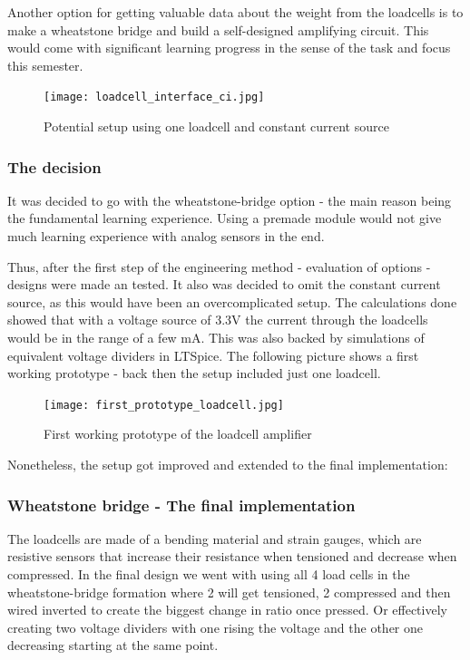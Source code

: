 \documentclass[../report.tex]{subfiles}
\begin{document}
Another option for getting valuable data about the weight from the loadcells
is to make a wheatstone bridge and build a self-designed amplifying circuit.
This would come with significant learning progress in the sense of the task and 
focus this semester.

\begin{figure}[H]
  \centering
  \texttt{[image: loadcell\_interface\_ci.jpg]}
  \caption{Potential setup using one loadcell and constant current source}
\end{figure} 

\subsubsection{The decision}
It was decided to go with the wheatstone-bridge option - the main reason being
the fundamental learning experience. Using a premade module would not give much 
learning experience with analog sensors in the end. 

\quad
Thus, after the first step of the engineering method - evaluation of options -
designs were made an tested.
It also was decided to omit the constant current source, as this would have been an 
overcomplicated setup. The calculations done showed that with a voltage source of 3.3V
the current through the loadcells would be in the range of a few mA. This was also backed
by simulations of equivalent voltage dividers in LTSpice.
The following picture shows a first working prototype - back then the setup included just one loadcell. 
\begin{figure}[H]
  \centering
  \texttt{[image: first\_prototype\_loadcell.jpg]}
  \caption{First working prototype of the loadcell amplifier}
\end{figure}

Nonetheless, the setup got improved 
and extended to the final implementation:
\subsubsection{Wheatstone bridge - The final implementation}

The loadcells are made of a bending material and strain gauges, which are resistive
sensors that increase their resistance when tensioned and decrease when compressed.
In the final design we went with using all 4 load cells in the wheatstone-bridge formation
where 2 will get tensioned, 2 compressed and then wired inverted to create the biggest change
in ratio once pressed. Or effectively creating two voltage dividers with one rising the voltage
and the other one decreasing starting at the same point.
\end{document}
